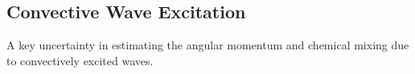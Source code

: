 {\color{purple}
\subsection{Convective Wave Excitation}
}



A key uncertainty in estimating the angular momentum and chemical mixing due to convectively excited waves.
